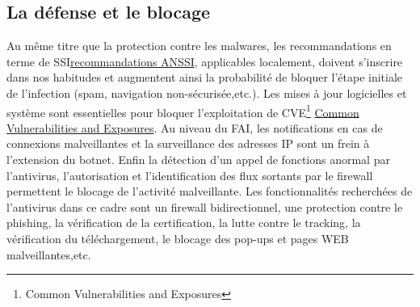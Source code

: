 \subsection{La défense et le blocage}
Au même titre que la protection contre les malwares, les recommandations en terme de SSI\href{https://www.ssi.gouv.fr/administration/bonnes-pratiques/}{recommandations ANSSI}, applicables localement, doivent s'inscrire dans nos habitudes et augmentent ainsi la probabilité de bloquer l'étape initiale de l'infection (spam, navigation non-sécurisée,etc.).
\newline Les mises à jour logicielles et système sont essentielles pour bloquer l'exploitation de CVE\footnote{Common Vulnerabilities and Exposures} \href{https://www.cvedetails.com}{Common Vulnerabilities and Exposures}.
\newline Au niveau du FAI, les notifications en cas de connexions malveillantes et la surveillance des adresses IP sont un frein à l'extension du botnet.
\newline Enfin la détection d'un appel de fonctions anormal par l'antivirus, l'autorisation et l’identification des flux sortants par le firewall permettent le blocage de l'activité malveillante.
Les fonctionnalités recherchées de l'antivirus dans ce cadre sont un firewall bidirectionnel, une protection contre le phishing, la vérification de la certification, la lutte contre le tracking, la vérification du téléchargement, le blocage des pop-ups et pages WEB malveillantes,etc. 
